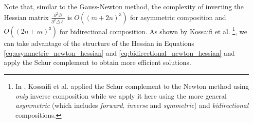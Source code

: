 Note that, similar to the Gauss-Newton method, the complexity of inverting the Hessian matrix $\frac{\partial^2 \mathcal{D}}{\partial^2 \Delta \boldsymbol{\ell}}$ is $O((m+2n)^3)$ for asymmetric composition and $O((2n + m)^3)$ for bidirectional composition. As shown by Kossaifi et al. \cite{Kossaifi2014}\footnote{In \cite{Kossaifi2014}, Kossaifi et al. applied the Schur complement to the Newton method using \emph{only} inverse composition while we apply it here using the more general \emph{asymmetric} (which includes \emph{forward}, \emph{inverse} and \emph{symmetric}) and \emph{bidirectional} compositions.}, we can take advantage of the structure of the Hessian in Equations \ref{eq:asymmetric_newton_hessian} and \ref{eq:bidirectional_newton_hessian} and apply the Schur complement to obtain more efficient solutions.


